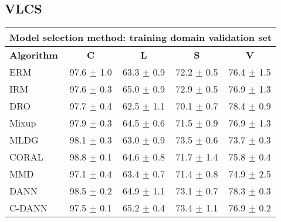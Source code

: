 \documentclass{article}
\begin{document}
\clearpage
\newpage
\subsection{VLCS}
\begin{center}
\begin{tabular}{lcccc}
\toprule
\multicolumn{5}{c}{\textbf{Model selection method: training domain validation set}} \\
\midrule
\textbf{Algorithm}    & \textbf{C}                & \textbf{L}                & \textbf{S}                & \textbf{V}                \\
\midrule
ERM                       & 97.6 $\pm$ 1.0            & 63.3 $\pm$ 0.9            & 72.2 $\pm$ 0.5            & 76.4 $\pm$ 1.5            \\
IRM                       & 97.6 $\pm$ 0.3            & 65.0 $\pm$ 0.9            & 72.9 $\pm$ 0.5            & 76.9 $\pm$ 1.3            \\
DRO                 & 97.7 $\pm$ 0.4            & 62.5 $\pm$ 1.1            & 70.1 $\pm$ 0.7            & 78.4 $\pm$ 0.9            \\
Mixup                     & 97.9 $\pm$ 0.3            & 64.5 $\pm$ 0.6            & 71.5 $\pm$ 0.9            & 76.9 $\pm$ 1.3            \\
MLDG                      & 98.1 $\pm$ 0.3            & 63.0 $\pm$ 0.9            & 73.5 $\pm$ 0.6            & 73.7 $\pm$ 0.3            \\
CORAL                     & 98.8 $\pm$ 0.1            & 64.6 $\pm$ 0.8            & 71.7 $\pm$ 1.4            & 75.8 $\pm$ 0.4            \\
MMD                       & 97.1 $\pm$ 0.4            & 63.4 $\pm$ 0.7            & 71.4 $\pm$ 0.8            & 74.9 $\pm$ 2.5            \\
DANN                       & 98.5 $\pm$ 0.2            & 64.9 $\pm$ 1.1            & 73.1 $\pm$ 0.7            & 78.3 $\pm$ 0.3            \\
C-DANN                   & 97.5 $\pm$ 0.1            & 65.2 $\pm$ 0.4            & 73.4 $\pm$ 1.1            & 76.9 $\pm$ 0.2            \\
\bottomrule
\end{tabular}
\end{center}
\end{document}
